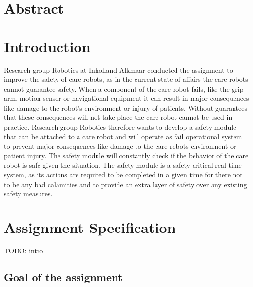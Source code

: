 \documentclass[12pt]{scrreprt}
\begin{document}
\newpage
\chapter*{Abstract}
\tableofcontents
\newpage
{}

\chapter{Introduction}
\label{Introduction}
Research group Robotics at Inholland Alkmaar conducted the assignment to improve the safety of care robots, as in the current state of affairs the care robots cannot guarantee safety. When a component of the care robot fails, like the grip arm, motion sensor or navigational equipment it can result in major consequences like damage to the robot's environment or injury of patients. Without guarantees that these consequences will not take place the care robot cannot be used in practice. Research group Robotics therefore wants to develop a safety module that can be attached to a care robot and will operate as fail operational system to prevent major consequences like damage to the care robots environment or patient injury. The safety module will constantly check if the behavior of the care robot is safe given the situation. The safety module is a safety critical real-time system, as its actions are required to be completed in a given time for there not to be any bad calamities and to provide an extra layer of safety over any existing safety measures.

\chapter{Assignment Specification}
TODO: intro\\

\section{Goal of the assignment}
\label{Goal of the assignment}
\end{document}
